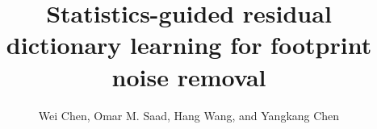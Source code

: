 %
%
%
%
\DeclareRobustCommand{\old}[1]{}
\DeclareRobustCommand{\new}[1]{#1}
\DeclareRobustCommand{\dlo}[1]{}
\DeclareRobustCommand{\wen}[1]{#1}



\title{Statistics-guided residual dictionary learning for 
footprint noise removal}
\author{Wei Chen\footnotemark[1]\footnotemark[2], Omar M. Saad\footnotemark[1], Hang Wang\footnotemark[4], and Yangkang Chen\footnotemark[1]}

\renewcommand{\thefootnote}{\fnsymbol{footnote}}


\address{
\footnotemark[1]
Key Laboratory of Exploration Technology for Oil and Gas Resources\\
Ministry of Education\\
Yangtze University\\
\footnotemark[2]
Hubei Cooperative Innovation Center of Unconventional Oil and Gas\\
Yangtze University \\
\footnotemark[3]
School of Earth Sciences\\
Zhejiang University\\
Hangzhou, Zhejiang Province, China, 310027\\
\footnotemark[4]
ENSN Laboratory\\
Seismology Department\\
National Research Institute of Astronomy and Geophysics (NRIAG), Egypt
}



\maketitle


